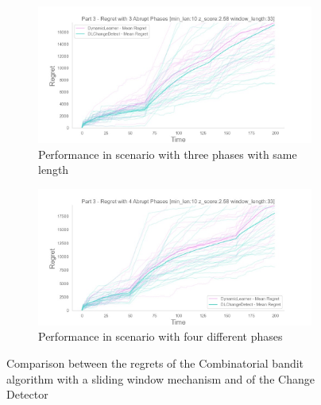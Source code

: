 \begin{figure}[!htb]
    \centering

    \begin{subfigure}[!H]{0.8\textwidth}
        \centering
        \includegraphics[width=\textwidth]{images/ThreeSamePhase.jpeg}
        \caption{Performance in scenario with three phases with same length}
        \label{comparisonPlot1}
    \end{subfigure}
    \begin{subfigure}[!H]{0.8\textwidth}
        \centering
        \includegraphics[width=\textwidth]{images/FourAbrupt.jpeg}
        \caption{Performance in scenario with four different phases}
        \label{comparisonPlot2}
    \end{subfigure}

    \caption{Comparison between the regrets of the Combinatorial bandit algorithm with a sliding window mechanism and of the Change Detector}
\end{figure}
